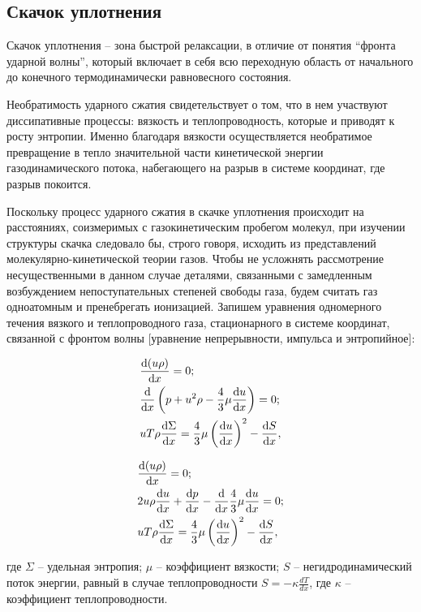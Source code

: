 \documentclass[10pt, a4paper]{article}
\begin{document}
\subsection{Скачок уплотнения}

Скачок уплотнения -- зона быстрой релаксации, в отличие от понятия ``фронта ударной волны'',
который включает в себя всю переходную область от начального до конечного термодинамически равновесного состояния.

Необратимость ударного сжатия свидетельствует о том, что в нем участвуют диссипативные процессы: вязкость и теплопроводность, которые и приводят к росту энтропии. Именно благодаря вязкости осуществляется необратимое превращение в тепло значительной части кинетической энергии газодинамического потока, набегающего на разрыв в системе координат, где разрыв покоится.

Поскольку процесс ударного сжатия в скачке уплотнения происходит на расстояниях, соизмеримых с газокинетическим пробегом молекул, при изучении структуры скачка следовало бы, строго говоря, исходить из представлений молекулярно-кинетической теории газов. Чтобы не усложнять рассмотрение несущественными в данном случае деталями,
связанными с замедленным возбуждением непоступательных степеней свободы
газа, будем считать газ одноатомным и пренебрегать ионизацией. Запишем уравнения одномерного течения вязкого и теплопроводного газа, стационарного в системе координат, связанной с фронтом волны [уравнение непрерывности, импульса и энтропийное]: 

\begin{align*}
	&\dv{(u\rho)}{x} = 0; \\
	&\dv{}{x}\left(p+u^2\rho-\frac{4}{3}\mu\dv{u}{x}\right)=0; \\
	&uT\rho\dv{\Sigma}{x} = \frac{4}{3}\mu \left(\dv{u}{x}\right)^{2}-\dv{S}{x},
\end{align*}

\begin{align*}
	&\dv{(u\rho)}{x} = 0; \\
	&2u\rho\dv{u}{x}+\dv{p}{x}-\dv{}{x}\frac{4}{3}\mu\dv{u}{x}=0; \\
	&uT\rho\dv{\Sigma}{x} = \frac{4}{3}\mu \left(\dv{u}{x}\right)^{2}-\dv{S}{x},
\end{align*}

где $\Sigma$ -- удельная энтропия; $\mu$ -- коэффициент вязкости; $S$ -- негидродинамический поток энергии, равный в случае теплопроводности $S=-\kappa \frac{dT}{dx}$, где $\kappa$ -- коэффициент теплопроводности.
\end{document}
